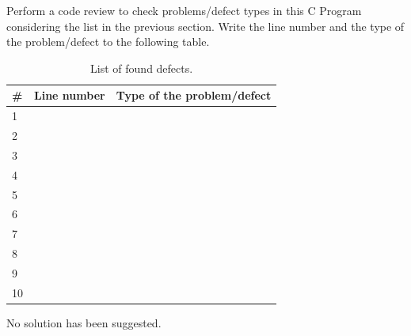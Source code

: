 \begin{exercise}
    Perform a code review to check problems/defect types in this C Program considering the list in the previous section. Write the line number and the type of the problem/defect to the following table.
    
    \begin{table}[H]
    \centering
    \renewcommand{\arraystretch}{1.2}
    \caption{List of found defects.}
    \label{tab:defects-ex}
    \begin{tabular}{p{}|p{}|p{}}
        \toprule
        \# & Line number & Type of the problem/defect\\
        \midrule
        1 & & \\
        \midrule
        2 & & \\
        \midrule
        3 & & \\
        \midrule
        4 & & \\
        \midrule
        5 & & \\
        \midrule
        6 & & \\
        \midrule
        7 & & \\
        \midrule
        8 & & \\
        \midrule
        9 & & \\
        \midrule
        10 & & \\
        \bottomrule
    \end{tabular}
\end{table}
\end{exercise}

\begin{solution}
    No solution has been suggested.
\end{solution}

